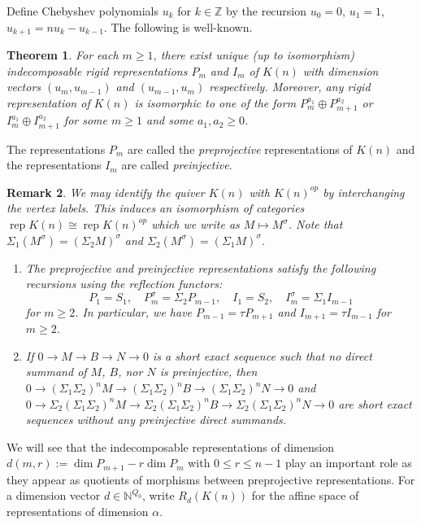 \documentclass{amsart}
\newtheorem{theorem}{Theorem}[section]
\newtheorem{remark}[theorem]{Remark}
\newcommand{\rep}{\operatorname{rep}}
\newcommand{\ZZ}{\mathbb{Z}}
\newcommand{\NN}{\mathbb{N}}
\newcommand{\ses}[3]{0\rightarrow #1\rightarrow #2\rightarrow#3\rightarrow 0}
\begin{document}
Define Chebyshev polynomials $u_k$ for $k\in\ZZ$ by the recursion $u_0=0$, $u_1=1$, $u_{k+1}=nu_k-u_{k-1}$.
The following is well-known.
\begin{theorem}
  \label{th:rigids}
  For each $m\ge1$, there exist unique (up to isomorphism) indecomposable rigid representations $P_m$ and $I_m$ of $K(n)$ with dimension vectors $(u_m,u_{m-1})$ and $(u_{m-1},u_m)$ respectively. 
  Moreover, any rigid representation of $K(n)$ is isomorphic to one of the form $P_m^{a_1}\oplus P_{m+1}^{a_2}$ or $I_m^{a_1}\oplus I_{m+1}^{a_2}$ for some $m\ge1$ and some $a_1,a_2\ge0$.
\end{theorem}
The representations $P_m$ are called the \emph{preprojective} representations of $K(n)$ and the representations $I_m$ are called \emph{preinjective}.
\begin{remark}\label{rem:reflection recursion}
  We may identify the quiver $K(n)$ with $K(n)^{op}$ by interchanging the vertex labels.
  This induces an isomorphism of categories $\rep K(n)\cong\rep K(n)^{op}$ which we write as $M\mapsto M^\sigma$.
  Note that $\Sigma_1(M^\sigma)=(\Sigma_2 M)^\sigma$ and $\Sigma_2(M^\sigma)=(\Sigma_1 M)^\sigma$.
  \begin{enumerate}
    \item The preprojective and preinjective representations satisfy the following recursions using the reflection functors:
      \[P_1=S_1,\quad P_m^\sigma=\Sigma_2 P_{m-1},\quad I_1=S_2,\quad I_m^\sigma=\Sigma_1 I_{m-1}\]
      for $m\ge2$.
      In particular, we have $P_{m-1}=\tau P_{m+1}$ and $I_{m+1}=\tau I_{m-1}$ for $m\ge2$.
    \item If $\ses{M}{B}{N}$ is a short exact sequence such that no direct summand of $M$, $B$, nor $N$ is preinjective, then $\ses{(\Sigma_1\Sigma_2)^nM}{(\Sigma_1\Sigma_2)^nB}{(\Sigma_1\Sigma_2)^nN}$ and $\ses{\Sigma_2(\Sigma_1\Sigma_2)^nM}{\Sigma_2(\Sigma_1\Sigma_2)^nB}{\Sigma_2(\Sigma_1\Sigma_2)^nN}$ are short exact sequences without any preinjective direct summands.
  \end{enumerate}
\end{remark}
We will see that the indecomposable representations of dimension $d(m,r):=\dim P_{m+1}-r\dim P_m$ with $0\leq r\leq n-1$ play an important role as they appear as quotients of morphisms between preprojective representations.
For a dimension vector $d\in\NN^{Q_0}$, write $R_d(K(n))$ for the affine space of representations of dimension $\alpha$.
\end{document}
